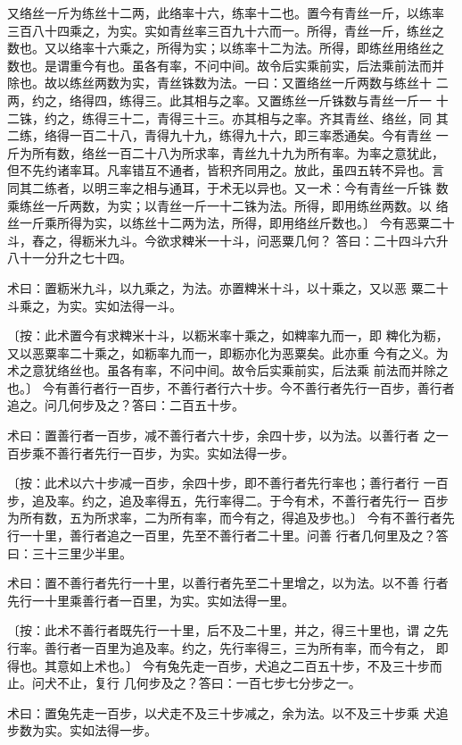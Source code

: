 \documentclass[a4paper,12pt,UTF8,twoside]{ctexbook}
\begin{document}
又络丝一斤为练丝十二两，此络率十六，练率十二也。置今有青丝一斤，以练率 三百八十四乘之，为实。实如青丝率三百九十六而一。所得，青丝一斤，练丝之 数也。又以络率十六乘之，所得为实；以练率十二为法。所得，即练丝用络丝之 数也。是谓重今有也。虽各有率，不问中间。故令后实乘前实，后法乘前法而并 除也。故以练丝两数为实，青丝铢数为法。一曰：又置络丝一斤两数与练丝十 二两，约之，络得四，练得三。此其相与之率。又置练丝一斤铢数与青丝一斤一 十二铢，约之，练得三十二，青得三十三。亦其相与之率。齐其青丝、络丝，同 其二练，络得一百二十八，青得九十九，练得九十六，即三率悉通矣。今有青丝 一斤为所有数，络丝一百二十八为所求率，青丝九十九为所有率。为率之意犹此， 但不先约诸率耳。凡率错互不通者，皆积齐同用之。放此，虽四五转不异也。言 同其二练者，以明三率之相与通耳，于术无以异也。又一术：今有青丝一斤铢 数乘练丝一斤两数，为实；以青丝一斤一十二铢为法。所得，即用练丝两数。以 络丝一斤乘所得为实，以练丝十二两为法，所得，即用络丝斤数也。〕 今有恶粟二十斗，舂之，得粝米九斗。今欲求粺米一十斗，问恶粟几何？ 答曰：二十四斗六升八十一分升之七十四。

术曰：置粝米九斗，以九乘之，为法。亦置粺米十斗，以十乘之，又以恶 粟二十斗乘之，为实。实如法得一斗。

〔按：此术置今有求粺米十斗，以粝米率十乘之，如粺率九而一，即 粺化为粝，又以恶粟率二十乘之，如粝率九而一，即粝亦化为恶粟矣。此亦重 今有之义。为术之意犹络丝也。虽各有率，不问中间。故令后实乘前实，后法乘 前法而并除之也。〕 今有善行者行一百步，不善行者行六十步。今不善行者先行一百步，善行者 追之。问几何步及之？答曰：二百五十步。

术曰：置善行者一百步，减不善行者六十步，余四十步，以为法。以善行者 之一百步乘不善行者先行一百步，为实。实如法得一步。

〔按：此术以六十步减一百步，余四十步，即不善行者先行率也；善行者行 一百步，追及率。约之，追及率得五，先行率得二。于今有术，不善行者先行一 百步为所有数，五为所求率，二为所有率，而今有之，得追及步也。〕 今有不善行者先行一十里，善行者追之一百里，先至不善行者二十里。问善 行者几何里及之？答曰：三十三里少半里。

术曰：置不善行者先行一十里，以善行者先至二十里增之，以为法。以不善 行者先行一十里乘善行者一百里，为实。实如法得一里。

〔按：此术不善行者既先行一十里，后不及二十里，并之，得三十里也，谓 之先行率。善行者一百里为追及率。约之，先行率得三，三为所有率，而今有之， 即得也。其意如上术也。〕 今有兔先走一百步，犬追之二百五十步，不及三十步而止。问犬不止，复行 几何步及之？答曰：一百七步七分步之一。

术曰：置兔先走一百步，以犬走不及三十步减之，余为法。以不及三十步乘 犬追步数为实。实如法得一步。
\end{document}
